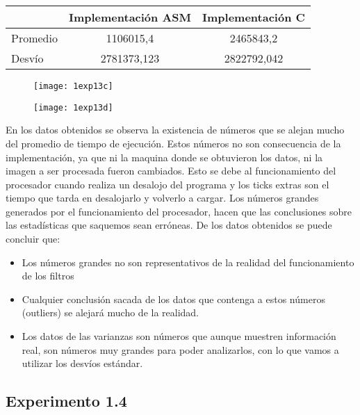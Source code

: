 ﻿\documentclass[a4paper]{article}
\begin{document}
\indent
\begin{tabular}{| l | c | c |}
	\hline
			& Implementaci\'on ASM & Implementaci\'on C\\
	\hline
	Promedio	 &	1106015,4 & 2465843,2\\
	Desvío	 &	2781373,123 & 2822792,042\\
	\hline
\end{tabular}

\begin{figure}[h]
  \centering
    \texttt{[image: 1exp13c]}
\end{figure}

\begin{figure}[h]
  \centering
    \texttt{[image: 1exp13d]}
\end{figure}

\newpage


En los datos obtenidos se observa la existencia de números que se alejan mucho del promedio de tiempo de ejecución.
Estos números no son consecuencia de la implementación, ya que ni la maquina donde se obtuvieron los datos, ni la imagen a ser procesada fueron cambiados.
Esto se debe al funcionamiento del procesador cuando realiza un desalojo del programa y los ticks extras son el tiempo que tarda en desalojarlo y volverlo a cargar.
Los números grandes generados por el funcionamiento del procesador, hacen que las conclusiones sobre las estadísticas que saquemos sean erróneas.
De los datos obtenidos se puede concluir que:
\begin{itemize}
\item Los números grandes no son representativos de la realidad del funcionamiento de los filtros
\item Cualquier conclusión sacada de los datos que contenga a estos números (outliers) se alejará mucho de la realidad. 
\item Los datos de las varianzas son números que aunque muestren información real, son números muy grandes para poder analizarlos, con lo que vamos a utilizar los desvíos estándar.
\end{itemize}

\subsection{Experimento 1.4}
\end{document}
